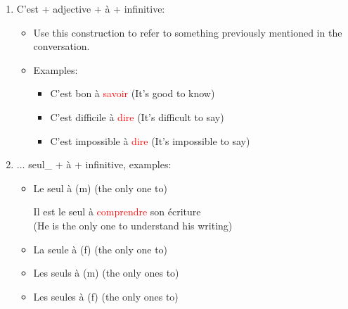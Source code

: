 \documentclass{book}
\begin{document}
\begin{enumerate}
\begin{itemize}
\begin{itemize}
            \begin{center}
                C'est difficile de \textcolor{red}{se détendre} \\
                (It's difficult to relax)
            \end{center}
            \item C'est bien de (It is good to) 
            \begin{center}
                C'est bien de \textcolor{red}{changer} d'air \\
                (It's good to get some fresh air)
            \end{center}
            \item C'est dommage de (It's too bad to)
        \end{itemize}
    \end{itemize}
    \item C'est + adjective + à + infinitive:
    \begin{itemize}
        \item Use this construction to refer to something previously mentioned in the conversation.
        \item Examples:
        \begin{itemize}
            \item C'est bon à \textcolor{red}{savoir} (It's good to know)
            \item C'est difficile à \textcolor{red}{dire} (It's difficult to say)
            \item C'est impossible à \textcolor{red}{dire} (It's impossible to say)
        \end{itemize}
    \end{itemize}
    \item $\dots$ seul\_ + à + infinitive, examples:
    \begin{itemize}
        \item Le seul à (m) (the only one to)
        \begin{center}
            Il est le seul à \textcolor{red}{comprendre} son écriture \\
            (He is the only one to understand his writing)
        \end{center}
        \item La seule à (f) (the only one to)   
        \item Les seuls à (m) (the only ones to)
        \item Les seules à (f) (the only ones to)
        \begin{center}

\end{center}
\end{itemize}
\end{enumerate}
\end{document}
